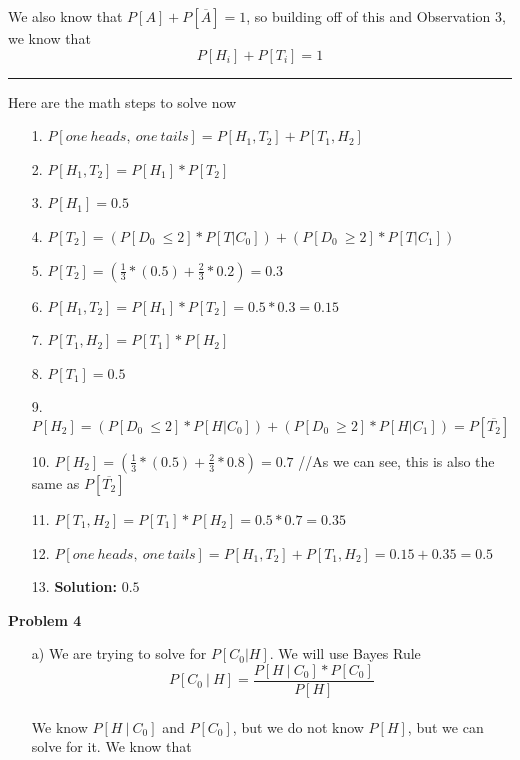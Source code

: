 \documentclass[11pt]{article}
\begin{document}
\begin{enumerate}
We also know that $P[A] + P[\overline{A}] = 1$, so building off of this and Observation 3, we know that
$$P[H_i] + P[T_i] = 1$$
\noindent\rule{20cm}{0.4pt}
Here are the math steps to solve now
\begin{enumerate}
\item[1. ] $P[one\ heads,\ one\ tails] = P[H_1,T_2] + P[T_1, H_2]$ \\
\item[2. ] $P[H_1, T_2] = P[H_1] * P[T_2]$\\
\item[3. ] $P[H_1] = 0.5$\\
\item[4. ] $P[T_2] = (P[D_0\ \leq 2] * P[T|C_0] ) + (P[D_0\ \geq 2] * P[T|C_1] )$\\
\item[5. ] $P[T_2] = (\frac{1}{3} * (0.5) + \frac{2}{3} * 0.2) = 0.3$\\
\item[6. ] $P[H_1, T_2] = P[H_1] * P[T_2] = 0.5 * 0.3 = 0.15$\\
\item[7. ] $P[T_1, H_2] = P[T_1] * P[H_2]$\\
\item[8. ] $P[T_1] = 0.5$\\
\item[9. ] $P[H_2] = (P[D_0\ \leq 2] * P[H|C_0] ) + (P[D_0\ \geq 2] * P[H|C_1] ) = P[\overline{T_2}]$\\
\item[10. ] $P[H_2] = (\frac{1}{3} * (0.5) + \frac{2}{3} * 0.8) = 0.7$ //As we can see, this is also the same as $P[\overline{T_2}]$\\
\item[11. ] $P[T_1, H_2] = P[T_1] * P[H_2] = 0.5 * 0.7 = 0.35$\\
\item[12. ] $P[one\ heads,\ one\ tails] = P[H_1,T_2] + P[T_1, H_2] = 0.15 + 0.35 = 0.5$\\
\item[13. ] \textbf{Solution: }$0.5$
\end{enumerate}
\newpage
\textbf{Problem 4}
\\
\begin{itemize}
\item[a) ] We are trying to solve for $P[C_0|H]$.  We will use Bayes Rule\\
$$ P[C_0\ |\ H] = \frac{P[H\ |\ C_0] * P[C_0]}{P[H]} $$
\\
We know $P[H\ |\ C_0]$ and $P[C_0]$, but we do not know $P[H]$, but we can solve for it. We know that

\end{itemize}
\end{enumerate}
\end{document}
